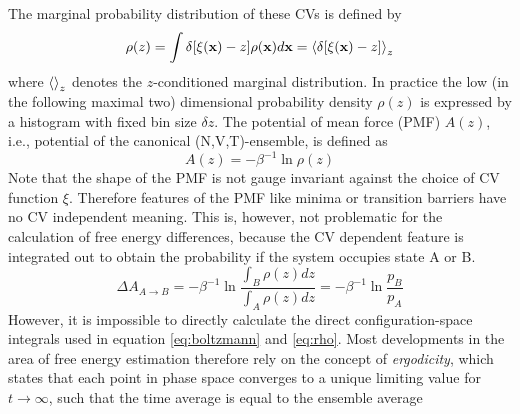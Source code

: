 The marginal probability distribution of these CVs is defined by
\begin{equation}
  \rho(z)=\int \delta[\xi(\textbf{x})-z]\rho(\textbf{x})d\textbf{x}=\braket{\delta [\xi(\textbf{x})-z]}_z
  \label{eq:rho}
\end{equation}
where $\braket{}_z$ denotes the $z$-conditioned marginal distribution.\autocite{chipot2007free}
In practice the low (in the following maximal two) dimensional probability density $\rho(z)$ is expressed by a histogram with fixed bin size $\delta z$.
The potential of mean force (PMF) $A(z)$, i.e., potential of the canonical (N,V,T)-ensemble, is defined as
\begin{equation}
  A(z) = -\beta^{-1}\ln \rho(z)
  \label{eq:free energy}
\end{equation}
Note that the shape of the PMF is not gauge invariant against the choice of CV function $\xi$.
Therefore features of the PMF like minima or transition barriers have no CV independent meaning.\autocite{hartmann2011two}
This is, however, not problematic for the calculation of free energy differences, because the CV dependent feature is integrated out to obtain the probability if the system occupies state A or B.
\begin{equation}
  \Delta A_{A\rightarrow B} = -\beta^{-1}\ln \frac{\int_B \rho(z)dz}{\int_A \rho(z)dz}=-\beta^{-1}\ln \frac{p_B}{p_A}
  \label{eq:free energy diff}
\end{equation}
However, it is impossible to directly calculate the direct configuration-space integrals used in equation \ref{eq:boltzmann} and \ref{eq:rho}.\autocite{chipot2007free}
Most developments in the area of free energy estimation therefore rely on the concept of \textit{ergodicity}\autocite{schutte2013metastability}, which states that each point in phase space converges to a unique limiting value for $t\rightarrow\infty$, such that the time average is equal to the ensemble average\autocite{barducci2011metadynamics}

